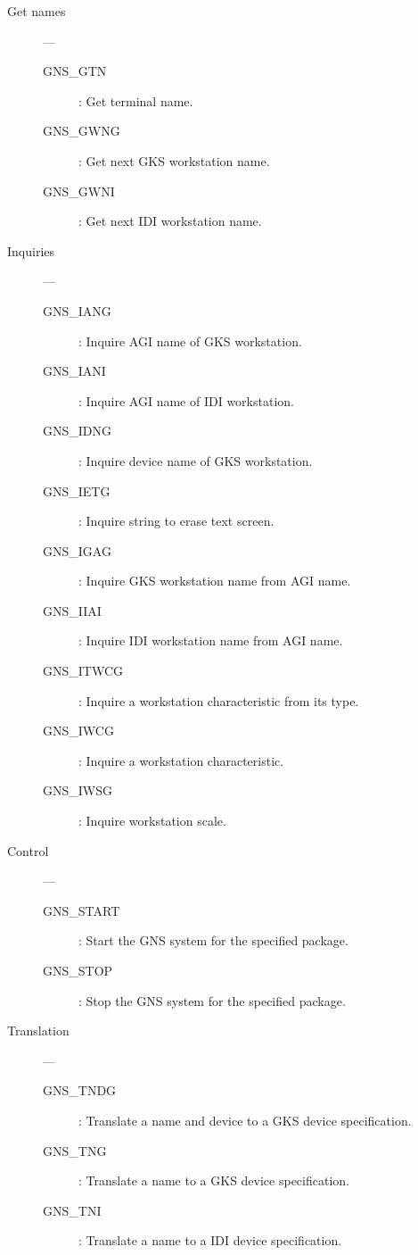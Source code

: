 \begin{description}

\item [Get names] ---

\begin{description}
\item [GNS\_GTN] : Get terminal name.
\item [GNS\_GWNG] : Get next GKS workstation name.
\item [GNS\_GWNI] : Get next IDI workstation name.
\end{description}

\item [Inquiries] --- 

\begin{description}
\item [GNS\_IANG] : Inquire AGI name of GKS workstation.
\item [GNS\_IANI] : Inquire AGI name of IDI workstation.
\item [GNS\_IDNG] : Inquire device name of GKS workstation.
\item [GNS\_IETG] : Inquire string to erase text screen.
\item [GNS\_IGAG] : Inquire GKS workstation name from AGI name.
\item [GNS\_IIAI] : Inquire IDI workstation name from AGI name.
\item [GNS\_ITWCG] : Inquire a workstation characteristic from its type.
\item [GNS\_IWCG] : Inquire a workstation characteristic.
\item [GNS\_IWSG] : Inquire workstation scale.
\end{description}

\item [Control] ---

\begin{description}
\item [GNS\_START] : Start the GNS system for the specified package.
\item [GNS\_STOP] : Stop the GNS system for the specified package.
\end{description}

\item [Translation] ---

\begin{description}
\item [GNS\_TNDG] : Translate a name and device to a GKS device specification.
\item [GNS\_TNG] : Translate a name to a GKS device specification.
\item [GNS\_TNI] : Translate a name to a IDI device specification.
\end{description}

\end{description}

